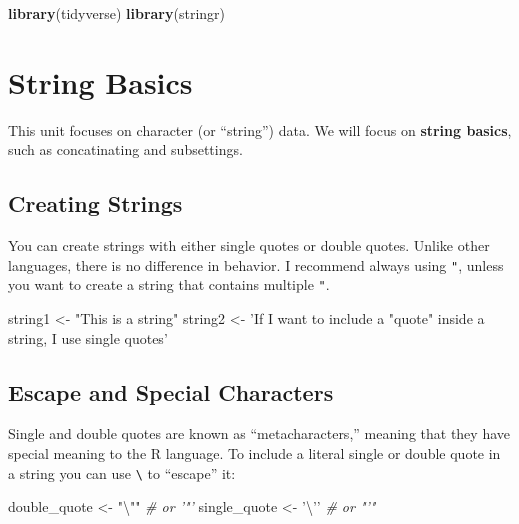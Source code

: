 \documentclass[
]{book}
\newenvironment{Shaded}{\begin{snugshade}}{\end{snugshade}}
\newcommand{\CharTok}[1]{\textcolor[rgb]{0.31,0.60,0.02}{#1}}
\newcommand{\CommentTok}[1]{\textcolor[rgb]{0.56,0.35,0.01}{\textit{#1}}}
\newcommand{\KeywordTok}[1]{\textcolor[rgb]{0.13,0.29,0.53}{\textbf{#1}}}
\newcommand{\NormalTok}[1]{#1}
\newcommand{\StringTok}[1]{\textcolor[rgb]{0.31,0.60,0.02}{#1}}
\begin{document}
\begin{Shaded}
\begin{Highlighting}[]
\KeywordTok{library}\NormalTok{(tidyverse)}
\KeywordTok{library}\NormalTok{(stringr)}
\end{Highlighting}
\end{Shaded}

\hypertarget{string-basics}{%
\section{String Basics}\label{string-basics}}

This unit focuses on character (or ``string'') data. We will focus on \textbf{string basics}, such as concatinating and subsettings.

\hypertarget{creating-strings}{%
\subsection{Creating Strings}\label{creating-strings}}

You can create strings with either single quotes or double quotes. Unlike other languages, there is no difference in behavior. I recommend always using \texttt{"}, unless you want to create a string that contains multiple \texttt{"}.

\begin{Shaded}
\begin{Highlighting}[]
\NormalTok{string1 <-}\StringTok{ "This is a string"}
\NormalTok{string2 <-}\StringTok{ 'If I want to include a "quote" inside a string, I use single quotes'}
\end{Highlighting}
\end{Shaded}

\hypertarget{escape-and-special-characters}{%
\subsection{Escape and Special Characters}\label{escape-and-special-characters}}

Single and double quotes are known as ``metacharacters,'' meaning that they have special meaning to the R language. To include a literal single or double quote in a string you can use \texttt{\textbackslash{}} to ``escape'' it:

\begin{Shaded}
\begin{Highlighting}[]
\NormalTok{double_quote <-}\StringTok{ "}\CharTok{\textbackslash{}"}\StringTok{"} \CommentTok{# or '"'}
\NormalTok{single_quote <-}\StringTok{ '}\CharTok{\textbackslash{}'}\StringTok{'} \CommentTok{# or "'"}
\end{Highlighting}
\end{Shaded}
\end{document}
